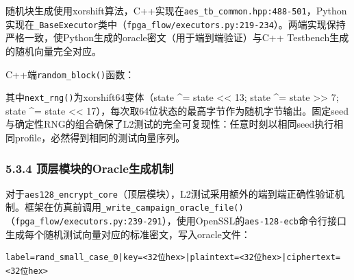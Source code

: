 随机块生成使用xorshift算法，C++实现在\texttt{aes\_tb\_common.hpp:488-501}，Python实现在\texttt{\_BaseExecutor}类中（\texttt{fpga\_flow/executors.py:219-234}）。两端实现保持严格一致，使Python生成的oracle密文（用于端到端验证）与C++
Testbench生成的随机向量完全对应。

C++端\texttt{random\_block()}函数：

\begin{Shaded}
\begin{Highlighting}[]
\OperatorTok{(}\OperatorTok{\&}\OperatorTok{)} \OperatorTok{\{}
\OperatorTok{\{\};}
     \OperatorTok{(}\OperatorTok{=} \OperatorTok{;}\OperatorTok{\textless{}} \OperatorTok{;} \OperatorTok{++}\OperatorTok{)} \OperatorTok{\{}
\OperatorTok{[}\OperatorTok{]} \OperatorTok{=} \OperatorTok{\textless{}}\OperatorTok{\textgreater{}(}\OperatorTok{(}\OperatorTok{)} \OperatorTok{\textgreater{}\textgreater{}} \OperatorTok{);}
    \OperatorTok{\}}
    \OperatorTok{;}
\OperatorTok{\}}
\end{Highlighting}
\end{Shaded}

其中\texttt{next\_rng()}为xorshift64变体（state \^{}= state
\textless\textless{} 13; state \^{}= state \textgreater\textgreater{} 7;
state \^{}= state \textless\textless{}
17），每次取64位状态的最高字节作为随机字节输出。固定seed与确定性RNG的组合确保了L2测试的完全可复现性：任意时刻以相同seed执行相同profile，必然得到相同的测试向量序列。

\subsubsection{5.3.4
顶层模块的Oracle生成机制}\label{ux9876ux5c42ux6a21ux5757ux7684oracleux751fux6210ux673aux5236}

对于\texttt{aes128\_encrypt\_core}（顶层模块），L2测试采用额外的端到端正确性验证机制。框架在仿真前调用\texttt{\_write\_campaign\_oracle\_file()}（\texttt{fpga\_flow/executors.py:239-291}），使用OpenSSL的\texttt{aes-128-ecb}命令行接口生成每个随机测试向量对应的标准密文，写入oracle文件：

\begin{verbatim}
label=rand_small_case_0|key=<32位hex>|plaintext=<32位hex>|ciphertext=<32位hex>
\end{verbatim}

